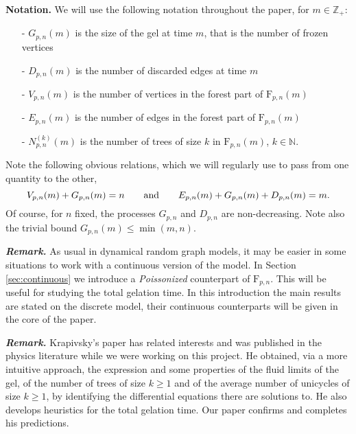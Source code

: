 \documentclass[a4, 11pt]{article}
\numberwithin{equation}{section}
\theoremstyle{plain}
\theoremstyle{definition}
\theoremstyle{remark}
\begin{document}
\bigskip

\textbf{Notation.} We will use the following notation throughout the paper, for $m \in \mathbb Z_+$:
\begin{enumerate}[topsep=0cm]
\item[-] $G_{p,n}(m)$ is the size of the gel at time $m$, that is the number of frozen vertices 
\item[-] $D_{p,n}(m)$ is the number of discarded edges at time $m$
\item[-] $V_{p,n}(m)$ is the number of vertices in the forest part of $\mathrm{F}_{p,n}(m)$
\item[-] $E_{p,n}(m)$ is the number of edges  in the forest part of $\mathrm{F}_{p,n}(m)$
\item[-] $N_{p,n}^{(k)}(m)$ is the number of trees of size $k$ in $\mathrm{F}_{p,n}(m)$, $k \in \mathbb N$. 
\end{enumerate}


Note the following obvious relations, which we will regularly use to pass from one quantity to the other,
\begin{equation}
\label{def:V_{p,n}E_{p,n}}
V_{p,n}(m)+G_{p,n}(m)=n \qquad \text{and} \qquad  E_{p,n}(m)+G_{p,n}(m)+D_{p,n}(m)=m.
\end{equation}
Of course, for $n$ fixed, the processes $G_{p,n}$ and $D_{p,n}$ are non-decreasing. Note also the trivial bound $G_{p,n}(m)\leq \min(m,n)$.

\bigskip

\emph{\textbf{Remark.}} As usual in dynamical random graph models, it may be easier in some situations to work with a continuous version of the model. In Section \ref{sec:continuous} we introduce a \emph{Poissonized} counterpart of $\mathrm{F}_{p,n}$. This will be useful for studying the total gelation time. In this introduction the main results are stated on the discrete model, their continuous counterparts will be given in the core of the paper.

\bigskip

\emph{\textbf{Remark.}} Krapivsky's paper \cite{krapisvky24} has related interests and was published in the physics literature while we were working on this project. He obtained, via a more intuitive approach, the expression and some properties of the fluid limits of the gel, of the number of trees of size $k\geq 1$ and of the average number of unicycles of size $k\geq 1$, by identifying the differential equations there are solutions to. He also develops heuristics for the total gelation time. Our paper confirms and completes his predictions. 
\end{document}
